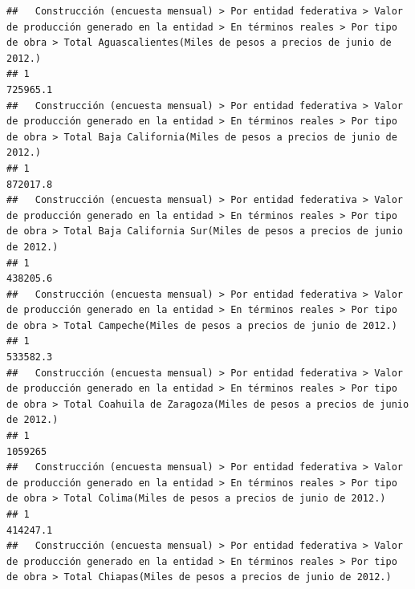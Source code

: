 \documentclass[
]{article}
\begin{document}
\begin{verbatim}
##   Construcción (encuesta mensual) > Por entidad federativa > Valor de producción generado en la entidad > En términos reales > Por tipo de obra > Total Aguascalientes(Miles de pesos a precios de junio de 2012.) 
## 1                                                                                                                                                                                                          725965.1
##   Construcción (encuesta mensual) > Por entidad federativa > Valor de producción generado en la entidad > En términos reales > Por tipo de obra > Total Baja California(Miles de pesos a precios de junio de 2012.) 
## 1                                                                                                                                                                                                           872017.8
##   Construcción (encuesta mensual) > Por entidad federativa > Valor de producción generado en la entidad > En términos reales > Por tipo de obra > Total Baja California Sur(Miles de pesos a precios de junio de 2012.) 
## 1                                                                                                                                                                                                               438205.6
##   Construcción (encuesta mensual) > Por entidad federativa > Valor de producción generado en la entidad > En términos reales > Por tipo de obra > Total Campeche(Miles de pesos a precios de junio de 2012.) 
## 1                                                                                                                                                                                                    533582.3
##   Construcción (encuesta mensual) > Por entidad federativa > Valor de producción generado en la entidad > En términos reales > Por tipo de obra > Total Coahuila de Zaragoza(Miles de pesos a precios de junio de 2012.) 
## 1                                                                                                                                                                                                                 1059265
##   Construcción (encuesta mensual) > Por entidad federativa > Valor de producción generado en la entidad > En términos reales > Por tipo de obra > Total Colima(Miles de pesos a precios de junio de 2012.) 
## 1                                                                                                                                                                                                  414247.1
##   Construcción (encuesta mensual) > Por entidad federativa > Valor de producción generado en la entidad > En términos reales > Por tipo de obra > Total Chiapas(Miles de pesos a precios de junio de 2012.) 

\end{verbatim}
\end{document}
